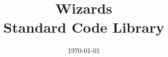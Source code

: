 \documentclass[titlepage, a4paper,10pt]{article}
\title{\LARGE{Wizards} \\[2ex] \Large{Standard Code Library} }
\date{\today}
\begin{document}
\maketitle
\begin{multicols*}{2}

\tableofcontents
\end{multicols*}

\begin{multicols}{2}


\newpage
\begin{spacing}{0.8}



\end{spacing}
\end{multicols}
\end{document}
